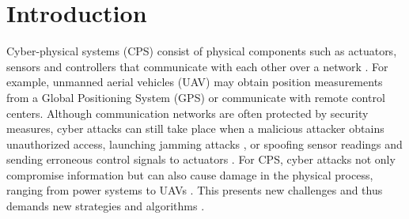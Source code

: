 \documentclass[../../thesis.tex]{subfiles}
\begin{document}



\section{Introduction}

Cyber-physical systems (CPS) consist of physical components such as actuators, sensors and controllers that communicate with each other over a network \cite{kim2012cyber}. For example, unmanned aerial vehicles (UAV) may obtain position measurements from a Global Positioning System (GPS) or communicate with remote control centers. Although communication networks are often protected by security measures, cyber attacks can still take place when a malicious attacker obtains unauthorized access, launching jamming attacks \cite{Gligor}, 
or spoofing sensor readings and sending erroneous control signals to actuators \cite{Mo}. For CPS, cyber attacks not only compromise information but can also cause damage in the physical process, ranging from power systems \cite{teixeira2010cyber, liu2011false} to UAVs \cite{hu2016uav}. This presents new challenges and thus demands new strategies and algorithms \cite{Sastry}.
\end{document}
